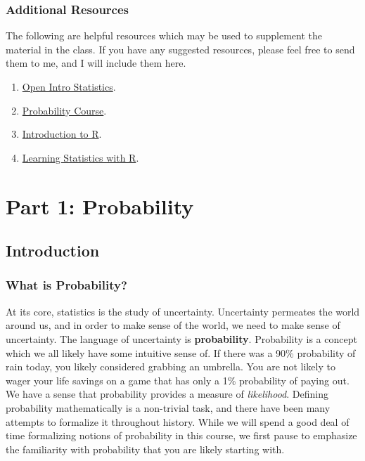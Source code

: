 \documentclass[
  letterpaper,
  DIV=11,
  numbers=noendperiod]{scrreprt}
\providecommand{\tightlist}{%
  \setlength{\itemsep}{0pt}\setlength{\parskip}{0pt}}\usepackage{longtable,booktabs,array}
\theoremstyle{definition}
\theoremstyle{definition}
\theoremstyle{definition}
\theoremstyle{remark}
\begin{document}
\section*{Additional Resources}\label{additional-resources}


The following are helpful resources which may be used to supplement the
material in the class. If you have any suggested resources, please feel
free to send them to me, and I will include them here.

\begin{enumerate}
\def\labelenumi{\arabic{enumi}.}
\tightlist
\item
  \href{https://www.openintro.org/book/os/}{Open Intro Statistics}.
\item
  \href{https://www.probabilitycourse.com/}{Probability Course}.
\item
  \href{https://bookdown.org/f_lennert/introduction-to-r/}{Introduction
  to R}.
\item
  \href{https://learningstatisticswithr.com/}{Learning Statistics with
  R}.
\end{enumerate}

\part{Part 1: Probability}

\chapter{Introduction}\label{introduction}

\section{What is Probability?}\label{what-is-probability}

At its core, statistics is the study of uncertainty. Uncertainty
permeates the world around us, and in order to make sense of the world,
we need to make sense of uncertainty. The language of uncertainty is
\textbf{probability}. Probability is a concept which we all likely have
some intuitive sense of. If there was a 90\% probability of rain today,
you likely considered grabbing an umbrella. You are not likely to wager
your life savings on a game that has only a 1\% probability of paying
out. We have a sense that probability provides a measure of
\emph{likelihood}. Defining probability mathematically is a non-trivial
task, and there have been many attempts to formalize it throughout
history. While we will spend a good deal of time formalizing notions of
probability in this course, we first pause to emphasize the familiarity
with probability that you are likely starting with.
\end{document}
